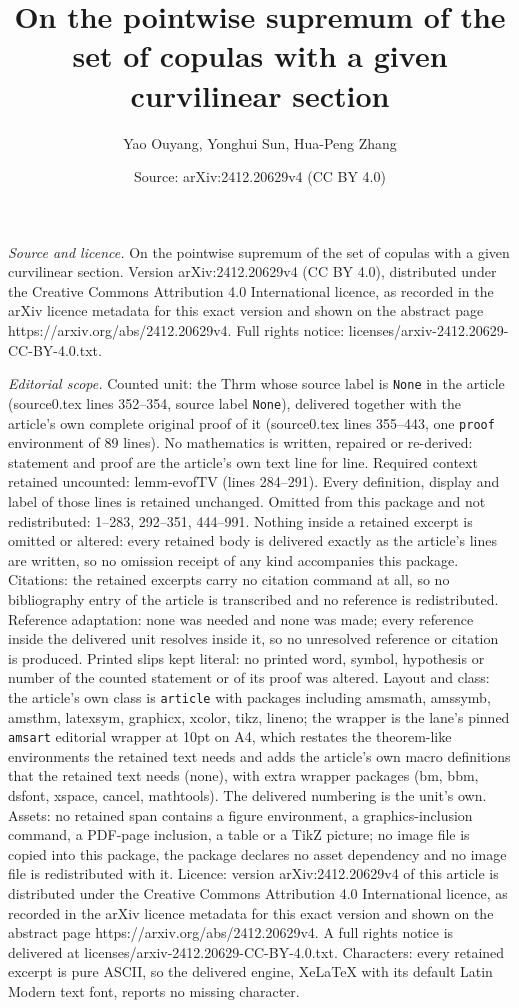 \documentclass[10pt,a4paper]{amsart}
\title[On the pointwise supremum of the set of copulas with a given]{On the pointwise supremum of the set of copulas with a given curvilinear section}
\author{Yao Ouyang, Yonghui Sun, Hua-Peng Zhang}
\date{Source: arXiv:2412.20629v4 (CC BY 4.0)}
\begin{document}
\maketitle

\noindent\emph{Source and licence.} On the pointwise supremum of the set of copulas with a given curvilinear section. Version arXiv:2412.20629v4 (CC BY 4.0), distributed under the Creative Commons Attribution 4.0 International licence, as recorded in the arXiv licence metadata for this exact version and shown on the abstract page https://arxiv.org/abs/2412.20629v4. Full rights notice: licenses/arxiv-2412.20629-CC-BY-4.0.txt.\par\smallskip

\noindent\textit{Editorial scope.} Counted unit: the Thrm whose source label is \texttt{None} in the article (source0.tex lines 352--354, source label \texttt{None}), delivered together with the article's own complete original proof of it (source0.tex lines 355--443, one \texttt{proof} environment of 89 lines). No mathematics is written, repaired or re-derived: statement and proof are the article's own text line for line. Required context retained uncounted: lemm-evofTV (lines 284--291). Every definition, display and label of those lines is retained unchanged. Omitted from this package and not redistributed: 1--283, 292--351, 444--991. Nothing inside a retained excerpt is omitted or altered: every retained body is delivered exactly as the article's lines are written, so no omission receipt of any kind accompanies this package. Citations: the retained excerpts carry no citation command at all, so no bibliography entry of the article is transcribed and no reference is redistributed. Reference adaptation: none was needed and none was made; every reference inside the delivered unit resolves inside it, so no unresolved reference or citation is produced. Printed slips kept literal: no printed word, symbol, hypothesis or number of the counted statement or of its proof was altered. Layout and class: the article's own class is \texttt{article} with packages including amsmath, amssymb, amsthm, latexsym, graphicx, xcolor, tikz, lineno; the wrapper is the lane's pinned \texttt{amsart} editorial wrapper at 10pt on A4, which restates the theorem-like environments the retained text needs and adds the article's own macro definitions that the retained text needs (none), with extra wrapper packages (bm, bbm, dsfont, xspace, cancel, mathtools). The delivered numbering is the unit's own. Assets: no retained span contains a figure environment, a graphics-inclusion command, a PDF-page inclusion, a table or a TikZ picture; no image file is copied into this package, the package declares no asset dependency and no image file is redistributed with it. Licence: version arXiv:2412.20629v4 of this article is distributed under the Creative Commons Attribution 4.0 International licence, as recorded in the arXiv licence metadata for this exact version and shown on the abstract page https://arxiv.org/abs/2412.20629v4. A full rights notice is delivered at licenses/arxiv-2412.20629-CC-BY-4.0.txt. Characters: every retained excerpt is pure ASCII, so the delivered engine, XeLaTeX with its default Latin Modern text font, reports no missing character.
\end{document}
